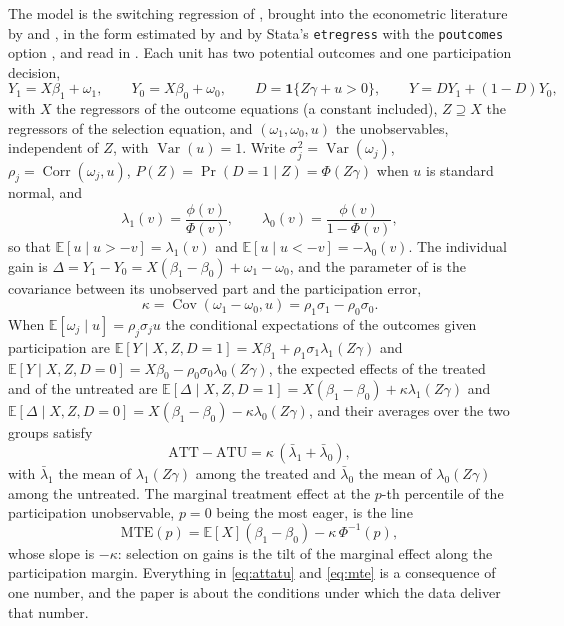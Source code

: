 \documentclass[11pt,a4paper]{article}
\theoremstyle{plain}
\theoremstyle{definition}
\theoremstyle{remark}
\newcommand{\E}{\mathbb{E}}
\newcommand{\Cov}{\operatorname{Cov}}
\newcommand{\Var}{\operatorname{Var}}
\newcommand{\Corr}{\operatorname{Corr}}
\newcommand{\ATT}{\mathrm{ATT}}
\newcommand{\ATU}{\mathrm{ATU}}
\newcommand{\MTE}{\mathrm{MTE}}
\newcommand{\1}{\mathbf{1}}
\newcommand{\cmd}[1]{\texttt{#1}}
\begin{document}
The model is the switching regression of \citet{roy1951}, brought into
the econometric literature by \citet{heckman1976,heckman1978} and
\citet{maddala1983}, in the form estimated by \citet{lokshin2004} and
by Stata's \cmd{etregress} with the \cmd{poutcomes} option
\citep{statacorp2025}, and read in \citet{araar2026sog}. Each
unit has two potential outcomes and one participation decision,
\begin{equation}\label{eq:model}
Y_1=X\beta_1+\omega_1,\qquad Y_0=X\beta_0+\omega_0,\qquad
D=\1\{Z\gamma+u>0\},\qquad Y=DY_1+(1-D)Y_0,
\end{equation}
with $X$ the regressors of the outcome equations (a constant included),
$Z\supseteq X$ the regressors of the selection equation, and
$(\omega_1,\omega_0,u)$ the unobservables, independent of $Z$, with
$\Var(u)=1$. Write $\sigma_j^2=\Var(\omega_j)$,
$\rho_j=\Corr(\omega_j,u)$, $P(Z)=\Pr(D=1\mid Z)=\Phi(Z\gamma)$ when $u$ is
standard normal, and
\begin{equation}\label{eq:mills}
\lambda_1(v)=\frac{\phi(v)}{\Phi(v)},\qquad \lambda_0(v)=\frac{\phi(v)}{1-\Phi(v)},
\end{equation}
so that $\E[u\mid u>-v]=\lambda_1(v)$ and $\E[u\mid u<-v]=-\lambda_0(v)$.
The individual gain is $\Delta=Y_1-Y_0=X(\beta_1-\beta_0)+\omega_1-\omega_0$,
and the parameter of \citet{araar2026sog} is the covariance between its
unobserved part and the participation error,
\begin{equation}\label{eq:kappa}
\kappa=\Cov(\omega_1-\omega_0,u)=\rho_1\sigma_1-\rho_0\sigma_0.
\end{equation}
When $\E[\omega_j\mid u]=\rho_j\sigma_j u$ the conditional expectations
of the outcomes given participation are
$\E[Y\mid X,Z,D=1]=X\beta_1+\rho_1\sigma_1\lambda_1(Z\gamma)$ and
$\E[Y\mid X,Z,D=0]=X\beta_0-\rho_0\sigma_0\lambda_0(Z\gamma)$, the
expected effects of the treated and of the untreated are
$\E[\Delta\mid X,Z,D=1]=X(\beta_1-\beta_0)+\kappa\lambda_1(Z\gamma)$ and
$\E[\Delta\mid X,Z,D=0]=X(\beta_1-\beta_0)-\kappa\lambda_0(Z\gamma)$, and
their averages over the two groups satisfy
\begin{equation}\label{eq:attatu}
\ATT-\ATU=\kappa\,(\bar\lambda_1+\bar\lambda_0),
\end{equation}
with $\bar\lambda_1$ the mean of $\lambda_1(Z\gamma)$ among the treated
and $\bar\lambda_0$ the mean of $\lambda_0(Z\gamma)$ among the untreated.
The marginal treatment effect at the $p$-th percentile of the
participation unobservable, $p=0$ being the most eager, is the line
\begin{equation}\label{eq:mte}
\MTE(p)=\E[X](\beta_1-\beta_0)-\kappa\,\Phi^{-1}(p),
\end{equation}
whose slope is $-\kappa$: selection on gains is the tilt of the marginal
effect along the participation margin. Everything in \eqref{eq:attatu}
and \eqref{eq:mte} is a consequence of one number, and the paper is about
the conditions under which the data deliver that number.
\end{document}
